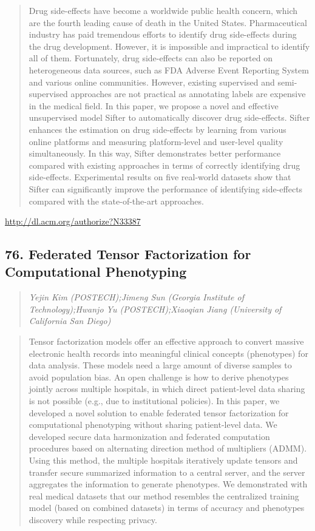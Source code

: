 \documentclass{article}
\begin{document}
\begin{quote}
Drug side-effects have become a worldwide public health concern, which are the fourth leading cause of death in the United States. Pharmaceutical industry has paid tremendous efforts to identify drug side-effects during the drug development. However, it is impossible and impractical to identify all of them. Fortunately, drug side-effects can also be reported on heterogeneous data sources, such as FDA Adverse Event Reporting System and various online communities. However, existing supervised and semi-supervised approaches are not practical as annotating labels are expensive in the medical field. In this paper, we propose a novel and effective unsupervised model Sifter to automatically discover drug side-effects. Sifter enhances the estimation on drug side-effects by learning from various online platforms and measuring platform-level and user-level quality simultaneously. In this way, Sifter demonstrates better performance compared with existing approaches in terms of correctly identifying drug side-effects. Experimental results on five real-world datasets show that Sifter can significantly improve the performance of identifying side-effects compared with the state-of-the-art approaches.
\end{quote}

\href{http://dl.acm.org/authorize?N33387}{http://dl.acm.org/authorize?N33387}

\subsection{76. Federated Tensor Factorization for Computational Phenotyping}

\begin{quote}
\footnotesize{\textit{Yejin Kim (POSTECH);Jimeng Sun (Georgia Institute of Technology);Hwanjo Yu (POSTECH);Xiaoqian Jiang (University of California San Diego)}}

\end{quote}

\begin{quote}
Tensor factorization models offer an effective approach to convert massive electronic health records into meaningful clinical concepts (phenotypes) for data analysis. These models need a large amount of diverse samples to avoid population bias. An open challenge is how to derive phenotypes jointly across multiple hospitals, in which direct patient-level data sharing is not possible (e.g., due to institutional policies). In this paper, we developed a novel solution to enable federated tensor factorization for computational phenotyping without sharing patient-level data. We developed secure data harmonization and federated computation procedures based on alternating direction method of multipliers (ADMM). Using this method, the multiple hospitals iteratively update tensors and transfer secure summarized information to a central server, and the server aggregates the information to generate phenotypes. We demonstrated with real medical datasets that our method resembles the centralized training model (based on combined datasets) in terms of accuracy and phenotypes discovery while respecting privacy.
\end{quote}
\end{document}
